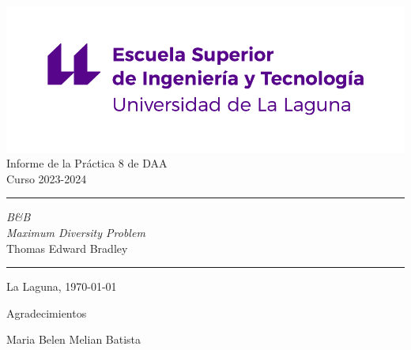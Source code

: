 \documentclass[spanish,a4paper,12pt,oneside]{extreport}
\begin{document}
\renewcommand\listtablename{Índice de Tablas}    
\renewcommand\listfigurename{Índice de Figuras}    

\pagestyle{empty}
\thispagestyle{empty}


\newcommand{\HRule}{\rule{\linewidth}{1mm}}
\setlength{\parindent}{0mm}
\setlength{\parskip}{0mm}


\begin{center}
\includegraphics[scale=0.8]{images/escuela-ingenieria-tecnologia-original}\\[10mm]
{\Huge Informe de la Práctica 8 de DAA \\[3mm] Curso 2023-2024}
\end{center}

\HRule
\begin{flushright}
        {\Huge \itshape B\&B \\ Maximum Diversity Problem} \\[5mm]
        {\Large Thomas Edward Bradley} \\[5mm]


\end{flushright}
\HRule
{}
\begin{center}
  \Large La Laguna, \today
\end{center}

\setlength{\parindent}{5mm}

\newpage
\thispagestyle{empty}

{ \flushright

\begin{LARGE}
Agradecimientos
\end{LARGE}

\hspace{3mm}

\begin{large}
Maria Belen Melian Batista

\bigskip

\end{large}

}
\newpage
\thispagestyle{empty}
\end{document}
